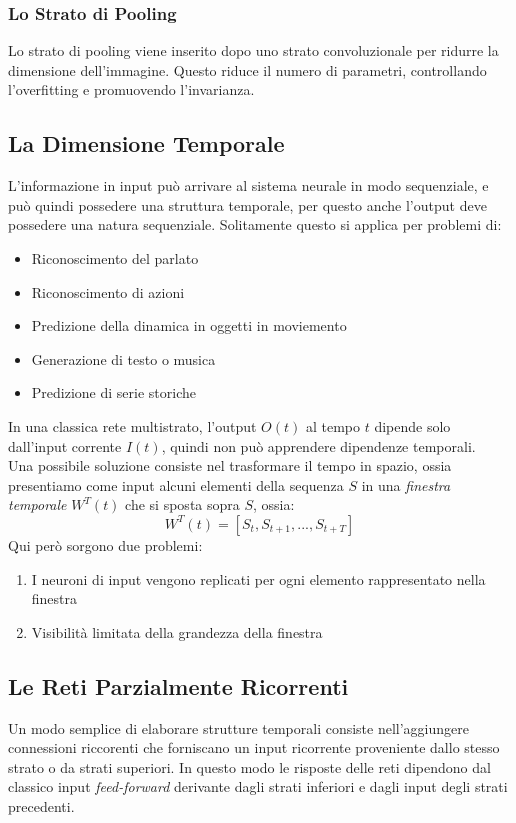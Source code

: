 \documentclass[12pt, a4paper]{article}
\begin{document}
\subsubsection{Lo Strato di Pooling}
Lo strato di pooling viene inserito dopo uno strato convoluzionale per ridurre la dimensione dell'immagine. Questo riduce il numero di parametri, controllando l'overfitting e promuovendo l'invarianza.

\subsection{La Dimensione Temporale}
L'informazione in input può arrivare al sistema neurale in modo sequenziale, e può quindi possedere una struttura temporale, per questo anche l'output deve possedere una natura sequenziale.
Solitamente questo si applica per problemi di:
\begin{itemize}
    \item Riconoscimento del parlato
    \item Riconoscimento di azioni
    \item Predizione della dinamica in oggetti in moviemento
    \item Generazione di testo o musica
    \item Predizione di serie storiche
\end{itemize}

In una classica rete multistrato, l'output \(O(t)\) al tempo \(t\) dipende solo dall'input corrente \(I(t)\), quindi non può apprendere dipendenze temporali.\\
Una possibile soluzione consiste nel trasformare il tempo in spazio, ossia presentiamo come input alcuni elementi della sequenza \(S\) in una \textit{finestra temporale} \(W^T(t)\) che si sposta sopra \(S\), ossia:
\[W^T(t)=[S_t, S_{t+1}, ... , S_{t+T}]\]
Qui però sorgono due problemi:
\begin{enumerate}
    \item I neuroni di input vengono replicati per ogni elemento rappresentato nella finestra
    \item Visibilità limitata della grandezza della finestra
\end{enumerate}
\subsection{Le Reti Parzialmente Ricorrenti}
Un modo semplice di elaborare strutture temporali consiste nell'aggiungere connessioni riccorenti che forniscano un input ricorrente proveniente dallo stesso strato o da strati superiori. In questo modo le risposte delle reti dipendono dal classico input \textit{feed-forward} derivante dagli strati inferiori e dagli input degli strati precedenti.\\
\end{document}

